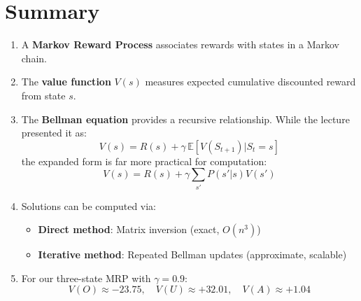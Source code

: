 \documentclass[11pt]{article}
\theoremstyle{definition}
\begin{document}
\section{Summary}

\begin{enumerate}
    \item A \textbf{Markov Reward Process} associates rewards with states in a Markov chain.

    \item The \textbf{value function} $V(s)$ measures expected cumulative discounted reward from state $s$.

    \item The \textbf{Bellman equation} provides a recursive relationship. While the lecture presented it as:
    \[V(s) = R(s) + \gamma \, \mathbb{E}[V(S_{t+1}) | S_t = s]\]
    the expanded form is far more practical for computation:
    \[V(s) = R(s) + \gamma \sum_{s'} P(s'|s) V(s')\]

    \item Solutions can be computed via:
    \begin{itemize}
        \item \textbf{Direct method}: Matrix inversion (exact, $O(n^3)$)
        \item \textbf{Iterative method}: Repeated Bellman updates (approximate, scalable)
    \end{itemize}

    \item For our three-state MRP with $\gamma = 0.9$:
    \[
    V(O) \approx -23.75, \quad V(U) \approx +32.01, \quad V(A) \approx +1.04
    \]
\end{enumerate}
\end{document}
